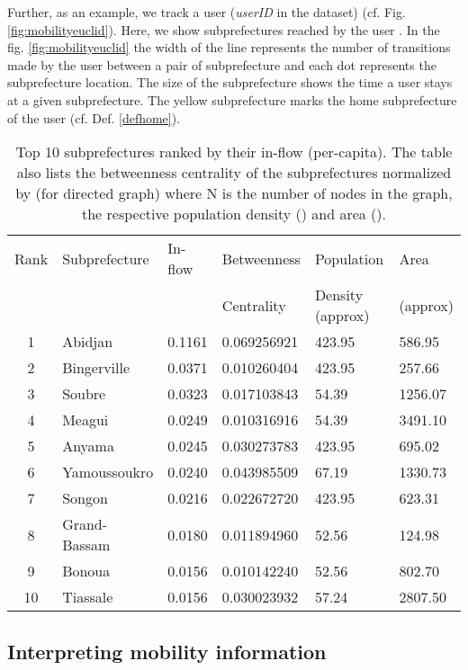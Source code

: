 \documentclass[review]{elsarticle}
\begin{document}
Further, as an example, we track a user  (\emph{userID} in the dataset) (cf. Fig. \ref{fig:mobilityeuclid}). Here, we show subprefectures reached by the user . In the fig. \ref{fig:mobilityeuclid} the width of the line represents the number of transitions made by the user between a pair of subprefecture and each dot represents the subprefecture location. The size of the subprefecture shows the time a user stays at a given subprefecture. The yellow subprefecture marks the home subprefecture of the user (cf. Def. \ref{defhome}).

\begin{table}[!t]
\centering
\begin{tabular}{|c|l|l|l|l|l|}
\hline
{\footnotesize Rank} & {\footnotesize Subprefecture} & {\footnotesize In-flow} & {\footnotesize Betweenness} & {\footnotesize Population} & {\footnotesize Area} \\
& & & {\footnotesize Centrality} & {\footnotesize Density (approx)} & {\footnotesize (approx)}\\
\hline
1 & Abidjan & 0.1161 & 0.069256921 & 423.95 & 586.95\\
2 & Bingerville & 0.0371 & 0.010260404 & 423.95 & 257.66\\
3 & Soubre & 0.0323 & 0.017103843 & 54.39 & 1256.07\\
4 & Meagui & 0.0249 & 0.010316916 & 54.39 & 3491.10\\
5 & Anyama & 0.0245 & 0.030273783 & 423.95 & 695.02\\
6 & Yamoussoukro & 0.0240 & 0.043985509 & 67.19 & 1330.73\\
7 & Songon & 0.0216 & 0.022672720 & 423.95 & 623.31\\
8 & Grand-Bassam & 0.0180 & 0.011894960 & 52.56 & 124.98\\
9 & Bonoua & 0.0156 & 0.010142240 & 52.56 & 802.70\\
10 & Tiassale & 0.0156 & 0.030023932 & 57.24 & 2807.50\\
\hline
\end{tabular}
\caption{Top 10 subprefectures ranked by their in-flow (per-capita). The table also lists the betweenness centrality of the subprefectures normalized by  (for directed graph) where N is the number of nodes in the graph, the respective population density () and area ().}
\label{table1}
\end{table}

\subsection{Interpreting mobility information}\label{subsec:Data set_2_and_3}
\end{document}
